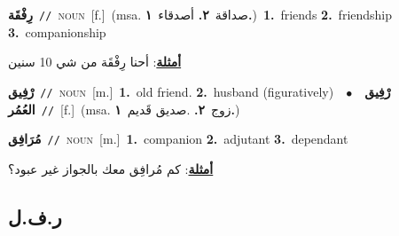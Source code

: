 \documentclass[10pt,a4paper,twoside]{article} %
\begin{document}
\begin{multicols}{2}
{\setlength\topsep{0pt}\textbf{\foreignlanguage{arabic}{رِفْقَة}}\ {\color{gray}\texttt{//}\color{black}}\ \textsc{noun}\ [f.]\ \color{gray}(msa. \foreignlanguage{arabic}{صداقة}~\foreignlanguage{arabic}{\textbf{٢.}}  \foreignlanguage{arabic}{أصدقاء}~\foreignlanguage{arabic}{\textbf{١.}})\color{black}\ \textbf{1.}~friends  \textbf{2.}~friendship  \textbf{3.}~companionship\  \begin{flushright}\color{gray}\foreignlanguage{arabic}{\textbf{\underline{\foreignlanguage{arabic}{أمثلة}}}: أحنا رِفْقَة من شي 10 سنين}\end{flushright}\color{black}} \vspace{2mm}

{\setlength\topsep{0pt}\textbf{\foreignlanguage{arabic}{رْفِيق}}\ {\color{gray}\texttt{//}\color{black}}\ \textsc{noun}\ [m.]\ \textbf{1.}~old friend.  \textbf{2.}~husband (figuratively)\ \ $\bullet$\ \ \setlength\topsep{0pt}\textbf{\foreignlanguage{arabic}{رْفِيق العُمُر}}\ {\color{gray}\texttt{//}\color{black}}\ [f.]\ \color{gray}(msa. \foreignlanguage{arabic}{زوج}~\foreignlanguage{arabic}{\textbf{٢.}}  .\foreignlanguage{arabic}{صديق قَديم}~\foreignlanguage{arabic}{\textbf{١.}})\color{black}\ } \vspace{2mm}

{\setlength\topsep{0pt}\textbf{\foreignlanguage{arabic}{مُرَافِق}}\ {\color{gray}\texttt{//}\color{black}}\ \textsc{noun}\ [m.]\ \textbf{1.}~companion  \textbf{2.}~adjutant  \textbf{3.}~dependant\  \begin{flushright}\color{gray}\foreignlanguage{arabic}{\textbf{\underline{\foreignlanguage{arabic}{أمثلة}}}: كم مُرافِق معك بالجواز غير عبود؟}\end{flushright}\color{black}} \vspace{2mm}

\vspace{-3mm}
\subsection*{\color{blue}\foreignlanguage{arabic}{ر.ف.ل}\color{blue}{}} 


\end{multicols}
\end{document}
